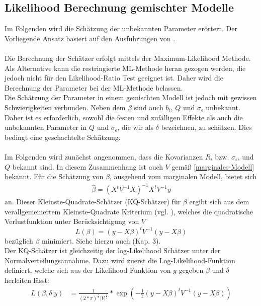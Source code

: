 \documentclass[%
thesis=student,%
coverpage=false,%
titlepage=false,%
headmarks=true, %
german,%
font=libertine, %
math=newpxtx, %
BCOR=5mm,%
coverBCOR=11mm%
]{tumbook}
\theoremstyle{break}
\begin{document}
\subsection{Likelihood Berechnung gemischter Modelle}
Im Folgenden wird die Schätzung der unbekannten Parameter erörtert. Der Vorliegende Ansatz basiert auf den Ausführungen von \cite{fahrmeir-2011-regression}.\\
\\
Die Berechnung der Schätzer erfolgt mittels der Maximum-Likelihood Methode. Als Alternative kann die restringierte ML-Methode heran gezogen werden, die jedoch nicht für den Likelihood-Ratio Test geeignet ist. Daher wird die Berechnung der Parameter bei der ML-Methode belassen.\\
Die Schätzung der Parameter in einem gemischten Modell ist jedoch mit gewissen Schwierigkeiten verbunden. Neben dem $\beta$ sind auch $b_i$, $Q$ und $\sigma_\epsilon$ unbekannt. Daher ist es erforderlich, sowohl die festen und zufälligen Effekte als auch die unbekannten Parameter in $Q$ und $\sigma_\epsilon$, die wir als $\delta$ bezeichnen, zu schätzen. Dies bedingt eine geschachtelte Schätzung.\\
\\
Im Folgenden wird zunächst angenommen, dass die Kovarianzen $R$, bzw. $\sigma_\epsilon$, und  $Q$ bekannt sind. In diesem Zusammenhang ist auch $V$ gemäß \ref{marginales-Modell} bekannt. Für die Schätzung von $\beta$, ausgehend vom marginalen Modell, bietet sich 
\begin{align}
	\hat{\beta} = (X^t V^{-1}X)^{-1}X^t V^{-1}y \label{KQ-Schätzerfürbeta}
\end{align} an.
Dieser Kleinste-Quadrate-Schätzer (KQ-Schätzer) für $\beta$ ergibt sich aus dem verallgemeinertem Kleinste-Quadrate Kriterium (vgl. \cite{KQ-Schätzer}), welches die quadratische Verlustfunktion unter Berücksichtigung von $V$
$$L(\beta) = (y-X\beta)^tV^{-1}(y-X\beta)$$ 
bezüglich $\beta$ minimiert. Siehe hierzu auch \cite{fahrmeir-2011-regression} (Kap. 3).\\
Der KQ-Schätzer ist gleichzeitig der log-Likelihood Schätzer unter der Normalverteilungsannahme. Dazu wird zuerst die Log-Likelihood-Funktion definiert, welche sich aus der Likelihood-Funktion von $y$ gegeben $\beta$ und $\delta$ herleiten lässt:
\begin{align}
	L(\beta,\delta|y) &= \frac{1}{(2*\pi)^{\frac{n}{2}}|V|^{\frac{1}{2}}} * \exp (-\frac{1}{2}(y-X\beta)^t V^{-1} (y-X\beta)) \\
\end{align}
\end{document}
